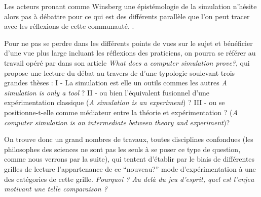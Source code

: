 
Les acteurs pronant comme Winsberg une épistémologie de la simulation n'hésite alors pas à débattre pour ce qui est des différents parallèle que l'on peut tracer avec les réflexions de cette communauté. .

Pour ne pas se perdre dans les différents points de vues sur le sujet et bénéficier d'une vue plus large incluant les réflexions des praticiens, on pourra se référer au travail opéré par \textcite{Varenne2001} dans son article \textit{What does a computer simulation prove?}, qui propose une lecture du débat au travers de d'une typologie soulevant trois grandes thèses : I - La simulation est elle un outils commes les autres \textit{A simulation is only a tool} ? II - ou bien l'équivalent fusionnel d'une expérimentation classique (\textit{A simulation is an experiment}) ? III - ou se positionne-t-elle comme médiateur entre la théorie et expérimentation ? (\textit{A computer simulation is an intermediate between theory and experiment})? 


On trouve donc un grand nombres de travaux, toutes disciplines confondues (les philosophes des sciences ne sont pas les seuls à se poser ce type de question, comme nous verrons par la suite), qui tentent d'établir par le biais de différentes grilles de lecture l'appartenance de ce \enquote{nouveau?} mode d'expérimentation à une des catégories de cette grille. \textit{Pourquoi ? Au delà du jeu d'esprit, quel est l'enjeu motivant une telle comparaison ?}


